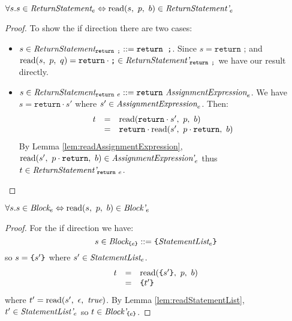 \documentclass[preprint,10pt]{sigplanconf}
\begin{document}
\begin{lemma}\mbox{}
  
  \( \forall s. s \in \textit{ReturnStatement}_{e} \Leftrightarrow 
  \textrm{read}(s,~p,~b) \in \textit{ReturnStatement'}_{e} \)
\end{lemma}
\begin{proof}
  To show the if direction there are two cases:
  \begin{itemize}
  \item \( s \in \textit{ReturnStatement}_{\texttt{return ;}} ::=
    \texttt{return ;} \). Since \( s = \texttt{return ;} \) and \(
    \textrm{read}(s,~p,~q) = \texttt{return}\cdot\texttt{;} \in
    \textit{ReturnStatement'}_{\texttt{return ;}} \) we have our result
    directly.

  \item \( s \in \textit{ReturnStatement}_{\texttt{return}~e} ::=
    \texttt{return}~ \textit{AssignmentExpression}_{e} \). We have \( s
    = \texttt{return}\cdot s' \) where \( s' \in
    \textit{AssignmentExpression}_{e} \). Then:
    \[
    \begin{array}{rcl}
      t &=& \textrm{read}(\texttt{return} \cdot s',~p,~b)
      \\
      &=& \texttt{return}\cdot \textrm{read}(s',~p \cdot \texttt{return},~b)
    \end{array}
    \]
    By Lemma \ref{lem:readAssignmentExpression}, \( \textrm{read}(s',~p
      \cdot \texttt{return},~b) \in \textit{AssignmentExpression'}_{e}
    \) thus \( t \in \textit{ReturnStatement'}_{\texttt{return}~e} \).
  \end{itemize}
\end{proof}

\begin{lemma}\mbox{}
  
  \( \forall s. s \in \textit{Block}_{e} \Leftrightarrow 
  \textrm{read}(s,~p,~b) \in \textit{Block'}_{e} \)
\end{lemma}
\begin{proof}
  For the if direction we have:
  \[ 
  s \in \textit{Block}_{\texttt{\{}e\texttt{\}}} ::= \texttt{\{}\textit{StatementList}_{e}\texttt{\}}
  \]
  so \( s = \texttt{\{}s'\texttt{\}} \) where \( s' \in \textit{StatementList}_{e} \).
  \[
  \begin{array}{rcl}
    t &=& \textrm{read}(\texttt{\{}s'\texttt{\}},~p,~b)
    \\
    &=& \texttt{\{}t'\texttt{\}}
  \end{array}
  \]
  where \( t' = \textrm{read}(s',~\epsilon,~\textit{true}) \). By Lemma
  \ref{lem:readStatementList}, \( t' \in \textit{StatementList'}_{e} \)
  so \( t \in \textit{Block'}_{\texttt{\{}e\texttt{\}}} \).
\end{proof}
\end{document}
